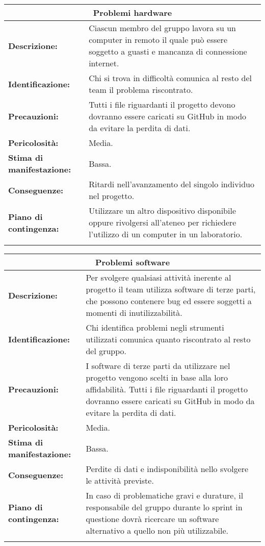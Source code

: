 \vspace{20pt}

\begin{tabularx}{\textwidth}{|X|X|}
\hline
\multicolumn{2}{|c|}{\textbf{Problemi hardware}} \\
\hline
\textbf{Descrizione:}& Ciascun membro del gruppo lavora su un computer in remoto il quale può essere soggetto a guasti e mancanza di connessione internet.\\
\hline
\textbf{Identificazione:}& Chi si trova in difficoltà comunica al resto del team il problema riscontrato.\\
\hline
\textbf{Precauzioni:}& Tutti i file riguardanti il progetto devono dovranno essere caricati su GitHub in modo da evitare la perdita di dati.\\
\hline
\textbf{Pericolosità:}& Media.\\
\hline
\textbf{Stima di manifestazione:}& Bassa.\\
\hline
\textbf{Conseguenze:}& Ritardi nell'avanzamento del singolo individuo nel progetto.\\
\hline
\textbf{Piano di contingenza:}& Utilizzare un altro dispositivo disponibile oppure rivolgersi all'ateneo per richiedere l'utilizzo di un computer in un laboratorio.\\
\hline
\caption{Problemi hardware}
\end{tabularx}

\begin{tabularx}{\textwidth}{|X|X|}
\hline
\multicolumn{2}{|c|}{\textbf{Problemi software}} \\
\hline
\textbf{Descrizione:}& Per svolgere qualsiasi attività inerente al progetto il team utilizza software di terze parti, che possono contenere bug ed essere soggetti a momenti di inutilizzabilità.\\
\hline
\textbf{Identificazione:}& Chi identifica problemi negli strumenti utilizzati comunica quanto riscontrato al resto del gruppo.\\
\hline
\textbf{Precauzioni:}& I software di terze parti da utilizzare nel progetto vengono scelti in base alla loro affidabilità. Tutti i file riguardanti il progetto dovranno essere caricati su GitHub in modo da evitare la perdita di dati.\\
\hline
\textbf{Pericolosità:}& Media.\\
\hline
\textbf{Stima di manifestazione:}& Bassa.\\
\hline
\textbf{Conseguenze:}& Perdite di dati e indisponibilità nello svolgere le attività previste.\\
\hline
\textbf{Piano di contingenza:}& In caso di problematiche gravi e durature, il responsabile del gruppo durante lo sprint in questione dovrà ricercare un software alternativo a quello non più utilizzabile.\\
\hline
\caption{Problemi software}
\end{tabularx}

